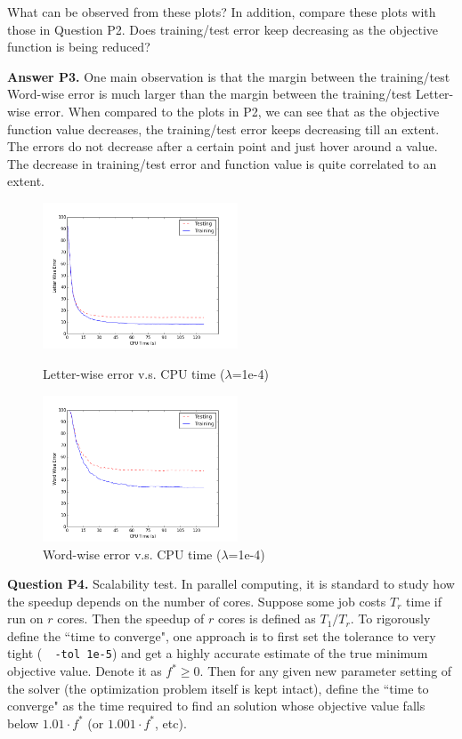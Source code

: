 \documentclass[11pt]{report}
\begin{document}
What can be observed from these plots?
In addition, compare these plots with those in Question P2.
Does training/test error keep decreasing as the objective function is being reduced?

{\bf Answer P3.} One main observation is that the margin between the training/test Word-wise error is much larger than the margin between the training/test Letter-wise error. When compared to the plots in P2, we can see that as the objective function value decreases, the training/test error keeps decreasing till an extent. The errors do not decrease after a certain point and just hover around a value. The decrease in training/test error and function value is quite correlated to an extent.

\begin{figure}[t]
	\centering
	\begin{minipage}[t]{0.49\textwidth}
		\centering
		\includegraphics[width=5.8cm]{q3-a}
		\caption{Letter-wise error v.s. CPU time ($\lambda$=1e-4)}
		\label{fig:letter_err}
	\end{minipage}
	\begin{minipage}[t]{0.49\textwidth}
		\centering
		\includegraphics[width=5.8cm]{q3-b}
		\caption{Word-wise error v.s. CPU time ($\lambda$=1e-4)}
		\label{fig:word_err}
	\end{minipage}
\end{figure}

{\bf Question P4.}
Scalability test.
In parallel computing, it is standard to study how the speedup depends on the number of cores.
Suppose some job costs $T_r$ time if run on $r$ cores.
Then the speedup of $r$ cores is defined as $T_1 / T_r$.
To rigorously define the ``time to converge",
one approach is to first set the tolerance to very tight (\eg\ \verb! -tol 1e-5!)
and get a highly accurate estimate of the true minimum objective value.
Denote it as $f^* \ge 0$.
Then for any given new parameter setting of the solver (the optimization problem itself is kept intact), define the ``time to converge" as the time required to find an solution whose objective value falls below $1.01 \cdot f^*$ (or  $1.001 \cdot f^*$, etc).
\end{document}
